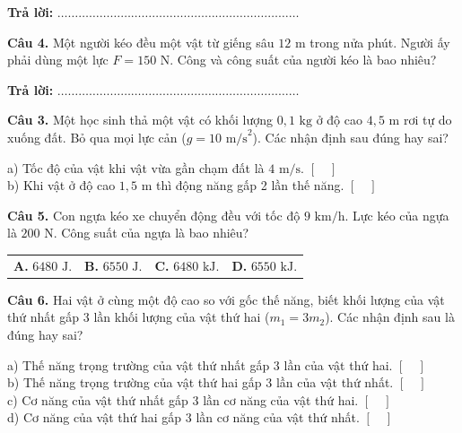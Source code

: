 \documentclass{article}
\begin{document}
\textbf{Trả lời:} $\dots\dots\dots\dots\dots\dots\dots\dots\dots\dots\dots\dots\dots\dots\dots\dots\dots\dots\dots\dots\dots\dots\dots$

\vspace*{\fill}

\textbf{Câu 4.} Một người kéo đều một vật từ giếng sâu $12\text{ m}$ trong nửa phút. Người ấy phải dùng một lực $F = 150\text{ N}$. Công và công suất của người kéo là bao nhiêu?
\vspace{8pt}

\textbf{Trả lời:} $\dots\dots\dots\dots\dots\dots\dots\dots\dots\dots\dots\dots\dots\dots\dots\dots\dots\dots\dots\dots\dots\dots\dots$
\vspace*{\fill}
\newpage

\fontsize{26}{34}\selectfont
\textbf{Câu 3.} Một học sinh thả một vật có khối lượng $0{,}1\text{ kg}$ ở độ cao $4{,}5\text{ m}$ rơi tự do xuống đất. Bỏ qua mọi lực cản ($g = 10\text{ m/s}^2$). Các nhận định sau đúng hay sai?
\vspace{4pt}

a) Tốc độ của vật khi vật vừa gần chạm đất là $4\text{ m/s}$. \hfill $[\quad]$\\[4pt]
b) Khi vật ở độ cao $1{,}5\text{ m}$ thì động năng gấp 2 lần thế năng. \hfill $[\quad]$

\vspace*{\fill}

\textbf{Câu 5.} Con ngựa kéo xe chuyển động đều với tốc độ $9\text{ km/h}$. Lực kéo của ngựa là $200\text{ N}$. Công suất của ngựa là bao nhiêu?
\vspace{6pt}

\begin{tabularx}{\linewidth}{@{}X X X X@{}}
\textbf{A.} $6480\text{ J}$. & \textbf{B.} $6550\text{ J}$. & \textbf{C.} $6480\text{ kJ}$. & \textbf{D.} $6550\text{ kJ}$.
\end{tabularx}
\vspace*{\fill}
\newpage

\fontsize{26}{34}\selectfont
\textbf{Câu 6.} Hai vật ở cùng một độ cao so với gốc thế năng, biết khối lượng của vật thứ nhất gấp 3 lần khối lượng của vật thứ hai ($m_1 = 3m_2$). Các nhận định sau là đúng hay sai?
\vspace{12pt}

a) Thế năng trọng trường của vật thứ nhất gấp 3 lần của vật thứ hai. \hfill $[\quad]$\\[8pt]
b) Thế năng trọng trường của vật thứ hai gấp 3 lần của vật thứ nhất. \hfill $[\quad]$\\[8pt]
c) Cơ năng của vật thứ nhất gấp 3 lần cơ năng của vật thứ hai. \hfill $[\quad]$\\[8pt]
d) Cơ năng của vật thứ hai gấp 3 lần cơ năng của vật thứ nhất. \hfill $[\quad]$
\end{document}
